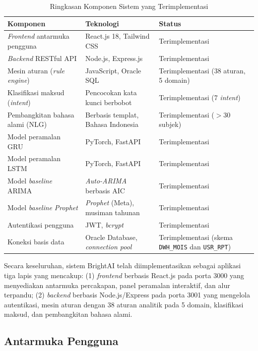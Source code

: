 \begin{table}[htbp]
\centering
\caption{Ringkasan Komponen Sistem yang Terimplementasi}
\label{tab:ringkasan-impl}
\begin{tabular}{|p{4.5cm}|p{4cm}|p{4.5cm}|}
\hline
\textbf{Komponen} & \textbf{Teknologi} & \textbf{Status} \\
\hline
\textit{Frontend} antarmuka pengguna & React.js 18, Tailwind CSS & Terimplementasi \\
\hline
\textit{Backend} RESTful API & Node.js, Express.js & Terimplementasi \\
\hline
Mesin aturan (\textit{rule engine}) & JavaScript, Oracle SQL & Terimplementasi (38 aturan, 5 domain) \\
\hline
Klasifikasi maksud (\textit{intent}) & Pencocokan kata kunci berbobot & Terimplementasi (7 \textit{intent}) \\
\hline
Pembangkitan bahasa alami (NLG) & Berbasis templat, Bahasa Indonesia & Terimplementasi ($>$30 subjek) \\
\hline
Model peramalan GRU & PyTorch, FastAPI & Terimplementasi \\
\hline
Model peramalan LSTM & PyTorch, FastAPI & Terimplementasi \\
\hline
Model \textit{baseline} ARIMA & \textit{Auto-ARIMA} berbasis AIC & Terimplementasi \\
\hline
Model \textit{baseline} \textit{Prophet} & \textit{Prophet} (Meta), musiman tahunan & Terimplementasi \\
\hline
Autentikasi pengguna & JWT, \textit{bcrypt} & Terimplementasi \\
\hline
Koneksi basis data & Oracle Database, \textit{connection pool} & Terimplementasi (skema \texttt{DWH\_MOIS} dan \texttt{USR\_RPT}) \\
\hline
\end{tabular}
\end{table}

Secara keseluruhan, sistem BrightAI telah diimplementasikan sebagai aplikasi tiga lapis yang mencakup: (1) \textit{frontend} berbasis React.js pada porta 3000 yang menyediakan antarmuka percakapan, panel peramalan interaktif, dan alur terpandu; (2) \textit{backend} berbasis Node.js/Express pada porta 3001 yang mengelola autentikasi, mesin aturan dengan 38 aturan analitik pada 5 domain, klasifikasi maksud, dan pembangkitan bahasa alami.

\subsection{Antarmuka Pengguna}
\label{subsec:antarmuka-pengguna}

